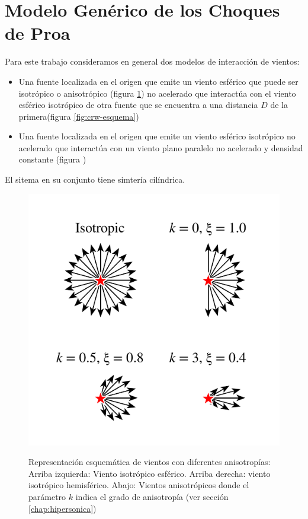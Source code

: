 \section{Modelo Genérico de los Choques de Proa}
\label{sec:Modelo-generico}
Para este trabajo consideramos en general dos modelos de
interacción  de vientos:
\begin{itemize}
\item Una fuente localizada en el origen que emite un viento esférico
  que puede ser isotrópico o anisotrópico (figura
  \ref{fig:isotropic-aniso}) no acelerado que interactúa con el viento
  esférico isotrópico de otra fuente que se encuentra a una distancia
  $D$ de la primera(figura \ref{fig:crw-esquema})
\item Una fuente localizada en el origen que emite un viento esférico
  isotrópico no acelerado que interactúa con un viento plano paralelo
  no acelerado y densidad constante (figura )
\end{itemize}
El sitema en su conjunto tiene simtería cilíndrica.
\begin{figure}
  \includegraphics[width=0.7\linewidth]{./Figures/anisotropic-arrows}
  \label{fig:isotropic-aniso}
  \caption{Representación esquemática de vientos con diferentes
    anisotropías:
    Arriba izquierda: Viento isotrópico esférico. Arriba derecha: viento
    isotrópico hemisférico. Abajo: Vientos anisotrópicos donde el
    parámetro $k$ indica el grado de anisotropía (ver sección
    \ref{chap:hipersonica})}
\end{figure}
